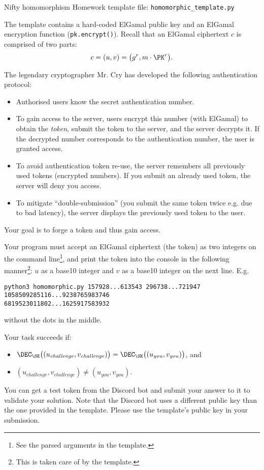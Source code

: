 \documentclass{homework}
\begin{document}
\begin{task}{Nifty homomorphism}
  Homework template file: \texttt{homomorphic\_template.py}

  The template contains a hard-coded ElGamal public key and an ElGamal encryption function (\texttt{pk.encrypt()}).
  Recall that an ElGamal ciphertext $c$ is comprised of two parts:
  \[
    c = (u, v) = \bigl(g^r, m\cdot\PK^r\bigr).
  \]

  The legendary cryptographer Mr. Cry has developed the following authentication protocol:
  \begin{itemize}
    \item Authorised users know the secret authentication number.
    \item To gain access to the server, users encrypt this number (with ElGamal) to obtain the \emph{token}, submit the token to the server, and the server decrypts it.
    If the decrypted number corresponds to the authentication number, the user is granted access.
    \item To avoid authentication token re-use, the server remembers all previously used tokens (encrypted numbers).
    If you submit an already used token, the server will deny you access.
    \item To mitigate \enquote{double-submission} (you submit the same token twice e.g. due to bad latency), the server displays the previously used token to the user.
  \end{itemize}

  Your goal is to forge a token and thus gain access.

  Your program must accept an ElGamal ciphertext (the token) as two integers on the command line\footnote{See the parsed arguments in the template.}, and print the token into the console in the following manner\footnote{This is taken care of by the template.}: $u$ as a base10 integer and $v$ as a base10 integer on the next line.
  E.g.
  \begin{Verbatim}
python3 homomorphic.py 157928...613543 296738...721947
1058509285116...9238765983746
6819523011802...1625917583932
  \end{Verbatim}
  without the dots in the middle.
  
  Your task succeeds if:
  \begin{itemize}
    \item $\DEC_\SK\bigl((u_\mathit{challenge}, v_\mathit{challenge})\bigr) = \DEC_\SK\bigl((u_\mathit{you}, v_\mathit{you})\bigr)$, and
    \item $(u_\mathit{challenge}, v_\mathit{challenge}) \neq (u_\mathit{you}, v_\mathit{you})$.
  \end{itemize}

  You can get a test token from the Discord bot and submit your answer to it to validate your solution.
  Note that the Discord bot uses a different public key than the one provided in the template.
  Please use the template's public key in your submission.
\end{task}
\end{document}
